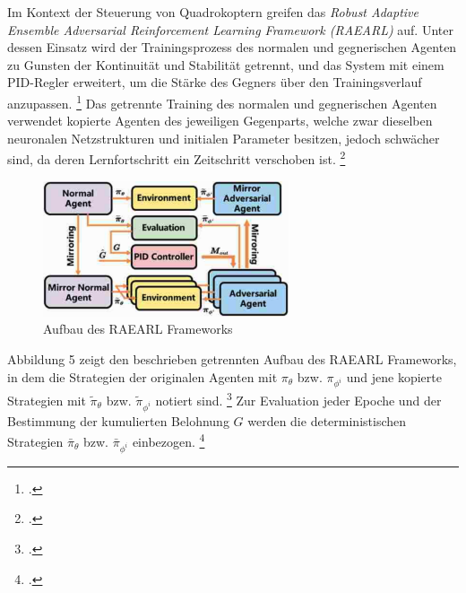 Im Kontext der Steuerung von Quadrokoptern greifen \cite[]{Zhai.2022} das \textit{Robust Adaptive Ensemble Adversarial Reinforcement Learning Framework (RAEARL)} auf.
Unter dessen Einsatz wird der Trainingsprozess des normalen und gegnerischen Agenten zu Gunsten der Kontinuität und Stabilität getrennt, und das System mit einem PID-Regler erweitert, um die Stärke des Gegners über den Trainingsverlauf anzupassen. \footcite[Vgl.][S. 2]{Zhai.2022}
Das getrennte Training des normalen und gegnerischen Agenten verwendet kopierte Agenten des jeweiligen Gegenparts, welche zwar dieselben neuronalen Netzstrukturen und initialen Parameter besitzen, jedoch schwächer sind, da deren Lernfortschritt ein Zeitschritt verschoben ist. \footcite[Vgl.][S. 2f.]{Zhai.2022}

\begin{figure}[htb]
    \centering
    \includegraphics[height=4cm]{lib/graphics/RAEARL Framework.png}
    \caption[Aufbau des RAEARL Frameworks]{Aufbau des RAEARL Frameworks\footnotemark}
    \label{abb:RAEARL}
\end{figure}

Abbildung 5 zeigt den beschrieben getrennten Aufbau des RAEARL Frameworks, in dem die Strategien der originalen Agenten mit $\pi_{\theta}$ bzw. $\pi_{\phi^{i}}$ und jene kopierte Strategien mit $\widetilde{\pi}_{\theta}$ bzw. $\widetilde{\pi}_{\phi^{i}}$ notiert sind. \footcite[Vgl.][S. 3]{Zhai.2022}
Zur Evaluation jeder Epoche und der Bestimmung der kumulierten Belohnung $G$ werden die deterministischen Strategien $\bar{\pi}_{\theta}$ bzw. $\bar{\pi}_{\phi^{i}}$ einbezogen. \footcite[Vgl.][S.3]{Zhai.2022}